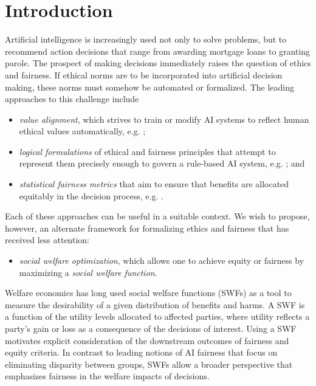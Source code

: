 \documentclass{article}[11pt]
\begin{document}
\section{Introduction}
Artificial intelligence is increasingly used not only to solve problems, but to recommend action decisions that range from awarding mortgage loans to granting parole.  The prospect of making decisions immediately raises the question of ethics and fairness.  If ethical norms are to be incorporated into artificial decision making, these norms must somehow be automated or formalized.  The leading approaches to this challenge include 
\begin{itemize}
    \item {\em value alignment}, which strives to train or modify AI systems to reflect human ethical values automatically, e.g. \cite{AllSmiWal05,Rus19,Gab20};
    \item {\em logical formulations} of ethical and fairness principles that attempt to represent them precisely enough to govern a rule-based AI system, e.g. \cite{BriArkBel06,LinMatNeb20,HooKim2018}; and
    \item {\em statistical fairness metrics} that aim to ensure that benefits are allocated equitably in the decision process, e.g. \cite{DwoHarPitReiZem12,MehMorSaxLerGal19,ChoRot20}.
\end{itemize}
Each of these approaches can be useful in a suitable context. We wish to propose, however, an alternate framework for formalizing ethics and fairness that has received less attention: 
\begin{itemize}
    \item {\em social welfare optimization}, which allows one to achieve equity or fairness by maximizing a {\em social welfare function}. 
\end{itemize}
Welfare economics has long used social welfare functions (SWFs) as a tool to measure the desirability of a given distribution of benefits and harms. A SWF is a function of the utility levels allocated to affected parties, where utility reflects a party's gain or loss as a consequence of the decisions of interest. Using a SWF motivates explicit consideration of the downstream outcomes of fairness and equity criteria. In contrast to leading notions of AI fairness that focus on eliminating disparity between groups, SWFs allow a broader perspective that emphasizes fairness in the welfare impacts of decisions. 
\end{document}
